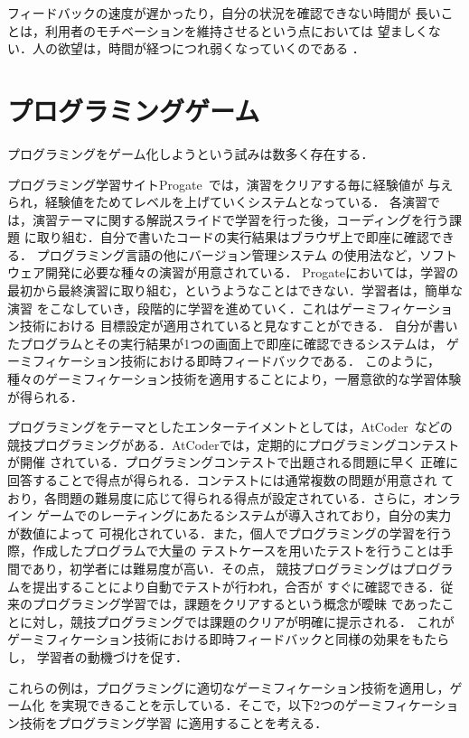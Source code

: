 \documentclass{jreport}
\begin{document}
フィードバックの速度が遅かったり，自分の状況を確認できない時間が
長いことは，利用者のモチベーションを維持させるという点においては
望ましくない．人の欲望は，時間が経つにつれ弱くなっていくのである
\cite{Inoue:Gamification}．

\section{プログラミングゲーム}
プログラミングをゲーム化しようという試みは数多く存在する．

プログラミング学習サイトProgate~\cite{Progate}では，演習をクリアする毎に経験値が
与えられ，経験値をためてレベルを上げていくシステムとなっている．
各演習では，演習テーマに関する解説スライドで学習を行った後，コーディングを行う課題
に取り組む．自分で書いたコードの実行結果はブラウザ上で即座に確認できる．
プログラミング言語の他にバージョン管理システム
の使用法など，ソフトウェア開発に必要な種々の演習が用意されている．
Progateにおいては，学習の最初から最終演習に取り組む，というようなことはできない．学習者は，簡単な演習
をこなしていき，段階的に学習を進めていく．これはゲーミフィケーション技術における
目標設定が適用されていると見なすことができる．
自分が書いたプログラムとその実行結果が1つの画面上で即座に確認できるシステムは，
ゲーミフィケーション技術における即時フィードバックである．
このように，種々のゲーミフィケーション技術を適用することにより，一層意欲的な学習体験
が得られる．

プログラミングをテーマとしたエンターテイメントとしては，AtCoder~\cite{AtCoder}などの
競技プログラミングがある．AtCoderでは，定期的にプログラミングコンテストが開催
されている．プログラミングコンテストで出題される問題に早く
正確に回答することで得点が得られる．コンテストには通常複数の問題が用意され
ており，各問題の難易度に応じて得られる得点が設定されている．さらに，オンライン
ゲームでのレーティングにあたるシステムが導入されており，自分の実力が数値によって
可視化されている．また，個人でプログラミングの学習を行う際，作成したプログラムで大量の
テストケースを用いたテストを行うことは手間であり，初学者には難易度が高い．その点，
競技プログラミングはプログラムを提出することにより自動でテストが行われ，合否が
すぐに確認できる．従来のプログラミング学習では，課題をクリアするという概念が曖昧
であったことに対し，競技プログラミングでは課題のクリアが明確に提示される．
これがゲーミフィケーション技術における即時フィードバックと同様の効果をもたらし，
学習者の動機づけを促す．

これらの例は，プログラミングに適切なゲーミフィケーション技術を適用し，ゲーム化
を実現できることを示している．そこで，以下2つのゲーミフィケーション技術をプログラミング学習
に適用することを考える．
\end{document}
